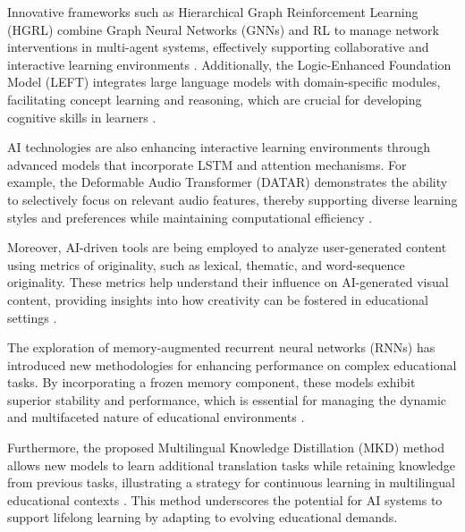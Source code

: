 Innovative frameworks such as Hierarchical Graph Reinforcement Learning (HGRL) combine Graph Neural Networks (GNNs) and RL to manage network interventions in multi-agent systems, effectively supporting collaborative and interactive learning environments \cite{chen2024adaptivenetworkinterventioncomplex}. Additionally, the Logic-Enhanced Foundation Model (LEFT) integrates large language models with domain-specific modules, facilitating concept learning and reasoning, which are crucial for developing cognitive skills in learners \cite{hsu2023whatsleftconceptgrounding}.



AI technologies are also enhancing interactive learning environments through advanced models that incorporate LSTM and attention mechanisms. For example, the Deformable Audio Transformer (DATAR) demonstrates the ability to selectively focus on relevant audio features, thereby supporting diverse learning styles and preferences while maintaining computational efficiency \cite{zhu2024deformableaudiotransformeraudio}.



Moreover, AI-driven tools are being employed to analyze user-generated content using metrics of originality, such as lexical, thematic, and word-sequence originality. These metrics help understand their influence on AI-generated visual content, providing insights into how creativity can be fostered in educational settings \cite{palmini2024patternscreativityuserinput}.



The exploration of memory-augmented recurrent neural networks (RNNs) has introduced new methodologies for enhancing performance on complex educational tasks. By incorporating a frozen memory component, these models exhibit superior stability and performance, which is essential for managing the dynamic and multifaceted nature of educational environments \cite{das2024exploringlearnabilitymemoryaugmentedrecurrent}.



Furthermore, the proposed Multilingual Knowledge Distillation (MKD) method allows new models to learn additional translation tasks while retaining knowledge from previous tasks, illustrating a strategy for continuous learning in multilingual educational contexts \cite{zhao2022lifelonglearningmultilingualneural}. This method underscores the potential for AI systems to support lifelong learning by adapting to evolving educational demands.



